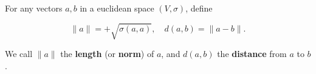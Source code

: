 For any vectors $a, b$ in a euclidean space $(V, \sigma)$, define

$$\|a\| = +\sqrt{\sigma(a, a)}, \quad d(a, b) = \|a - b\|.$$

We call $\|a\|$ the \textbf{length} (or \textbf{norm}) of $a$, and $d(a, b)$ the \textbf{distance} from $a$ to $b$.
